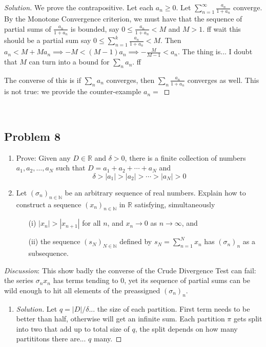 \documentclass{article}
\newcommand{\N}{{\mathbb N}}
\newcommand{\R}{{\mathbb R}}
\begin{document}
{\begin{proof}[Solution]\let\qed\relax
	We prove the contrapositive.
	Let each $a_n \geq 0$.
	Let $\sum_{n=1}^\infty \frac{a_n}{1+a_n}$ converge.
	By the Monotone Convergence criterion,
	we must have that the sequence of partial sums of $\frac{a_n}{1+a_n}$
	is bounded,
	say $0 \leq \frac{a_n}{1+a_n} < M$ and $M > 1$.
	ff wait this should be a partial sum
	say $0 \leq \sum_{n=1}^k \frac{a_n}{1+a_n} < M$.
	Then $a_n < M + Ma_n \implies -M < (M-1)a_n \implies -\frac{M}{M-1} < a_n$.
	The thing is... I doubt that $M$ can turn into a bound for $\sum_n a_n$.
	ff

	The converse of this is if $\sum_n a_n$ converges,
	then $\sum_n \frac{a_n}{1+a_n}$ converges as well.
	This is not true: we provide the counter-example
	$a_n = $
\end{proof}
\clearpage
~\clearpage

\subsection*{Problem 8}
{\it
\begin{enumerate}
	\item Prove: Given any $D \in \R$ and $\delta > 0$,
		there is a finite collection of numbers $a_1,a_2,\dots,a_N$
		such that $D = a_1 + a_2 + \cdots + a_N$ and
		\[
			\delta > |a_1| > |a_2| > \cdots > |a_N| > 0
		\]
	\item Let $(\sigma_n)_{n\in\N}$ be an arbitrary sequence of real numbers.
		Explain how to construct a sequence $(x_n)_{n\in\N}$ in $\R$ satisfying, simultaneously
		\begin{enumerate}
			\item[(i)] $|x_n| > |x_{n+1}|$ for all $n$, and $x_n \to 0$ as $n \to \infty$, and
			\item[(ii)] the sequence $(s_N)_{N\in\N}$ defined by
				$s_N = \sum_{n=1}^N x_n$ has $(\sigma_n)_n$ as a subsequence.
		\end{enumerate}
\end{enumerate}
\emph{Discussion}: This show badly the converse of the Crude Divergence Test can fail:
the series $\sigma_n x_n$ has terms tending to $0$,
yet its sequence of partial sums can be wild enough to
hit all elements of the preassigned $(\sigma_n)_n$.

\begin{enumerate}
	\item \begin{proof}[Solution]\let\qed\relax
		Let $q = |D|/\delta$... the size of each partition.
		First term needs to be better than half,
		otherwise will get an infinite sum.
		Each partition $\pi$ gets split into two that add up to total size of $q$,
		the split depends on how many partititons there are... $q$ many.


\end{proof}
\end{enumerate}}}
\end{document}
